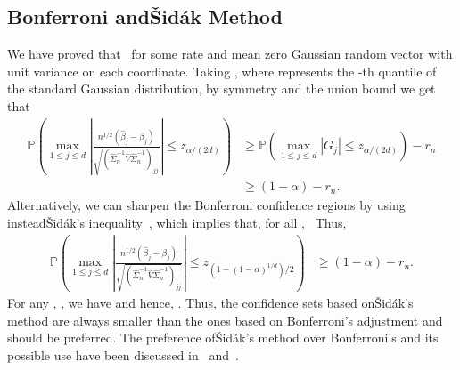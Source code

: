 \documentclass{article}
\begin{document}
\subsection{Bonferroni and{\v{S}}id{\'a}k Method}\label{subsec:bonferroni.sidak}
We have proved that
\ for some rate   and mean zero Gaussian random vector   with unit variance on each coordinate. Taking  , where   represents the  -th quantile of the standard Gaussian distribution, by symmetry and the union bound we get that
\begin{align*}
\mathbb{P}\left(\max_{1\le j\le d}\left|\frac{n^{1/2}(\widehat{\beta}_j - \beta_j)}{\sqrt{(\widehat{\Sigma}_n^{-1}\widehat{V}\widehat{\Sigma}_n^{-1})_{jj}}}\right| \le z_{\alpha/(2d)}\right) &\ge \mathbb{P}\left(\max_{1\le j\le d}|G_j| \le z_{\alpha/(2d)}\right) - r_n\\ &\ge (1 - \alpha) - r_n.
\end{align*}
Alternatively, we can sharpen the Bonferroni confidence regions by using instead{\v{S}}id{\'a}k's inequality~\citep{vsidak1967rectangular}, which implies that, for all  ,
\ Thus,
\begin{align*}
\mathbb{P}\left(\max_{1\le j\le d}\left|\frac{n^{1/2}(\widehat{\beta}_j - \beta_j)}{\sqrt{(\widehat{\Sigma}_n^{-1}\widehat{V}\widehat{\Sigma}_n^{-1})_{jj}}}\right| \le z_{(1 - (1-\alpha)^{1/d})/2}\right) &\ge (1 - \alpha) - r_n.
\end{align*}
For any  ,  , we have  
and hence,  . Thus, the confidence sets based on{\v{S}}id{\'a}k's method are always smaller than the ones based on Bonferroni's adjustment and should be preferred.
The preference of{\v{S}}id{\'a}k's method over Bonferroni's and its possible use have been discussed in~\cite{westfall1993resampling} and~\cite{drton2004model}.
\end{document}
